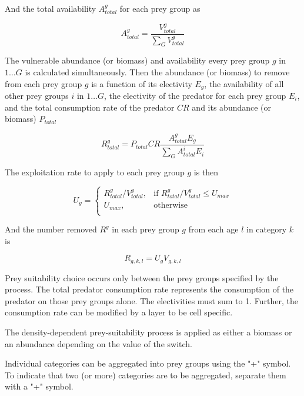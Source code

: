 And the total availability $A^g_{total}$ for each prey group as

\begin{equation}
A^g_{total} = \frac{V^g_{total}}{\sum\limits_G {V^g_{total}}}
\end{equation}

The vulnerable abundance (or biomass) and availability every prey group $g$ in $1 \ldots G$ is calculated simultaneously. Then the abundance (or biomass) to remove from each prey group $g$ is a function of its electivity $E_g$, the availability of all other prey groups $i$ in $1 \ldots G$, the electivity of the predator for each prey group $E_i$, and the total consumption rate of the predator $CR$ and its abundance (or biomass) $P_{total}$

\begin{equation}
R^g_{total}=P_{total} CR \frac{A^g_{total} E_g}{\sum\limits_G {A^i_{total} E_i}}
\end{equation}

The exploitation rate to apply to each prey group $g$ is then

\begin{equation}
U_g = \begin{cases}
R^g_{total}/V^g_{total}, & \text{if $R^g_{total}/V^g_{total} \leq U_{max}$} \\
U_{max}, & \text{otherwise}\\
\end{cases}
\end{equation}

And the number removed $R^g$ in each prey group $g$ from each age $l$ in category $k$ is

\begin{equation}
R_{g,k,l} = U_g V_{g,k,l}
\end{equation}

Prey suitability choice occurs only between the prey groups specified by the process. The total predator consumption rate represents the consumption of the predator on those prey groups alone. The electivities must sum to 1. Further, the consumption rate can be modified by a layer to be cell specific.

The density-dependent prey-suitability process is applied as either a biomass or an abundance depending on the value of the  switch.

Individual categories can be aggregated into prey groups using the "+" symbol. To indicate that two (or more) categories are to be aggregated, separate them with a "+" symbol.

